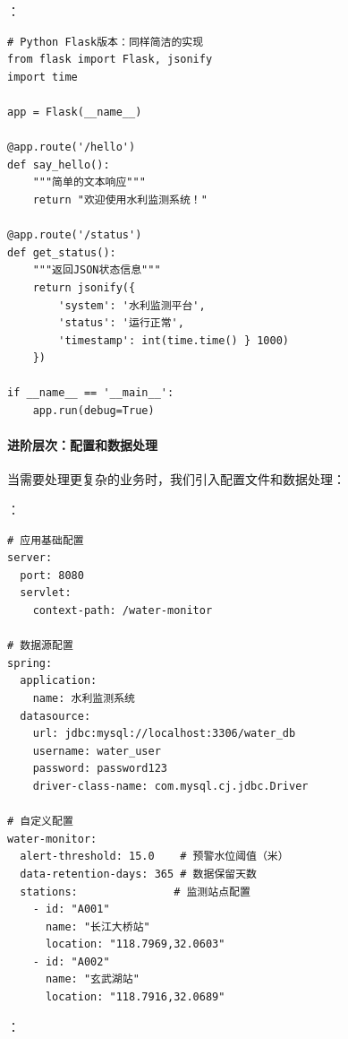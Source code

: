 ：

\begin{lstlisting}[style=python]
# Python Flask版本：同样简洁的实现
from flask import Flask, jsonify
import time

app = Flask(__name__)

@app.route('/hello')
def say_hello():
    """简单的文本响应"""
    return "欢迎使用水利监测系统！"

@app.route('/status')
def get_status():
    """返回JSON状态信息"""
    return jsonify({
        'system': '水利监测平台',
        'status': '运行正常',
        'timestamp': int(time.time() } 1000)
    })

if __name__ == '__main__':
    app.run(debug=True)
\end{lstlisting}

\hypertarget{ux8fdbux9636ux5c42ux6b21ux914dux7f6eux548cux6570ux636eux5904ux7406}{%
\paragraph{进阶层次：配置和数据处理}\label{ux8fdbux9636ux5c42ux6b21ux914dux7f6eux548cux6570ux636eux5904ux7406}}

当需要处理更复杂的业务时，我们引入配置文件和数据处理：

：

\begin{lstlisting}
# 应用基础配置
server:
  port: 8080
  servlet:
    context-path: /water-monitor

# 数据源配置
spring:
  application:
    name: 水利监测系统
  datasource:
    url: jdbc:mysql://localhost:3306/water_db
    username: water_user
    password: password123
    driver-class-name: com.mysql.cj.jdbc.Driver

# 自定义配置
water-monitor:
  alert-threshold: 15.0    # 预警水位阈值（米）
  data-retention-days: 365 # 数据保留天数
  stations:               # 监测站点配置
    - id: "A001"
      name: "长江大桥站"
      location: "118.7969,32.0603"
    - id: "A002"  
      name: "玄武湖站"
      location: "118.7916,32.0689"
\end{lstlisting}

：

